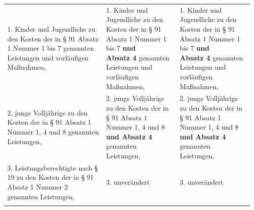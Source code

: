 \documentclass[10pt,a4paper,landscape]{article}
\begin{document}
\begin{longtable}{|L{8.2cm}|L{8.2cm}|L{8.2cm}|}
\hhline{|---|}
1.   \newline Kinder und Jugendliche zu den Kosten der  \newline in \S{} 91 Absatz 1 Nummer 1 bis 7  \newline genannten Leistungen und vorläufigen  \newline Maßnahmen, & 1.   \newline Kinder und Jugendliche zu den Kosten der  \newline in \S{} 91 Absatz 1 Nummer 1 bis 7 \textbf{und  \newline Absatz 4} genannten Leistungen und  \newline vorläufigen Maßnahmen, & 1.   \newline Kinder und Jugendliche zu den Kosten der  \newline in \S{} 91 Absatz 1 Nummer 1 bis 7 \textbf{und  \newline Absatz 4} genannten Leistungen und  \newline vorläufigen Maßnahmen, \\
\hhline{|---|}
2.   \newline junge Volljährige zu den Kosten der in \S{} 91  \newline Absatz 1 Nummer 1, 4 und 8 genannten  \newline Leistungen, & 2.  \newline junge Volljährige zu den Kosten der in \S{} 91  \newline Absatz 1 Nummer 1, 4 und 8 \textbf{und Absatz 4}  \newline genannten Leistungen, & 2.  \newline junge Volljährige zu den Kosten der in \S{} 91  \newline Absatz 1 Nummer 1, 4 und 8 \textbf{und Absatz 4}  \newline genannten Leistungen, \\
\hhline{|---|}
3.   \newline Leistungsberechtigte nach \S{} 19 zu den  \newline Kosten der in \S{} 91 Absatz 1 Nummer 2  \newline genannten Leistungen, & 3. unverändert & 3. unverändert \\
\hhline{|---|}

\end{longtable}
\end{document}
